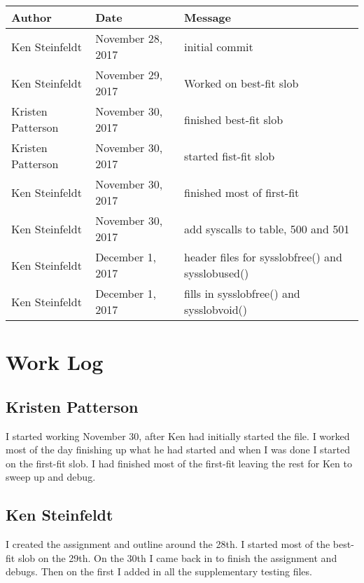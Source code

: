 \documentclass[10pt,letterpaper,onecolumn,draftclsnofoot]{IEEEtran}
\begin{document}
\begin{center}
	\begin{tabular}{|l|l|l|}
		\hline
		\textbf{Author} & \textbf{Date} & \textbf{Message} \\ \hline
		Ken Steinfeldt & November 28, 2017 & initial commit \\ \hline
		Ken Steinfeldt & November 29, 2017 & Worked on best-fit slob \\ \hline
		Kristen Patterson & November 30, 2017 & finished best-fit slob \\ \hline
		Kristen Patterson & November 30, 2017 & started fist-fit slob \\ \hline
		Ken Steinfeldt & November 30, 2017 & finished most of first-fit \\ \hline
		Ken Steinfeldt & November 30, 2017 & add syscalls to table, 500 and 501 \\ \hline
		Ken Steinfeldt & December 1, 2017 & header files for sysslobfree() and sysslobused() \\ \hline
		Ken Steinfeldt & December 1, 2017 & fills in sysslobfree() and sysslobvoid() \\ \hline
	\end{tabular}
\end{center}

\section{Work Log}
\subsection{Kristen Patterson}
I started working November 30, after Ken had initially started the file.
I worked most of the day finishing up what he had started and when I was done I started on the first-fit slob.
I had finished most of the first-fit leaving the rest for Ken to sweep up and debug.

\subsection{Ken Steinfeldt}
I created the assignment and outline around the 28th.
I started most of the best-fit slob on the 29th.
On the 30th I came back in to finish the assignment and debugs.
Then on the first I added in all the supplementary testing files.
\end{document}
